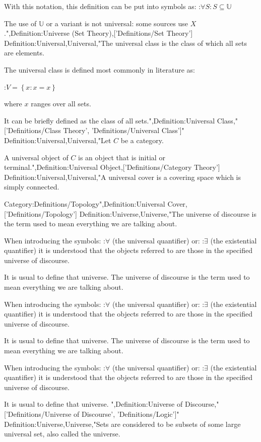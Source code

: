 With this notation, this definition can be put into symbols as:
:$\forall S: S \subseteq \mathbb U$


The use of $\mathbb U$ or a variant is not universal: some sources use $X$.",Definition:Universe (Set Theory),['Definitions/Set Theory']
Definition:Universal,Universal,"The universal class is the class of which all sets are elements.


The universal class is defined most commonly in literature as:

:$V = \left\lbrace x: x = x \right\rbrace$

where $x$ ranges over all sets.


It can be briefly defined as the class of all sets.",Definition:Universal Class,"['Definitions/Class Theory', 'Definitions/Universal Class']"
Definition:Universal,Universal,"Let $C$ be a category.


A universal object of $C$ is an object that is initial or terminal.",Definition:Universal Object,['Definitions/Category Theory']
Definition:Universal,Universal,"A universal cover is a covering space which is simply connected.



Category:Definitions/Topology",Definition:Universal Cover,['Definitions/Topology']
Definition:Universe,Universe,"The universe of discourse is the term used to mean everything we are talking about.


When introducing the symbols:
:$\forall$ (the universal quantifier)
or:
:$\exists$ (the existential quantifier)
it is understood that the objects referred to are those in the specified universe of discourse.

It is usual to define that universe.
The universe of discourse is the term used to mean everything we are talking about.


When introducing the symbols:
:$\forall$ (the universal quantifier)
or:
:$\exists$ (the existential quantifier)
it is understood that the objects referred to are those in the specified universe of discourse.

It is usual to define that universe.
The universe of discourse is the term used to mean everything we are talking about.


When introducing the symbols:
:$\forall$ (the universal quantifier)
or:
:$\exists$ (the existential quantifier)
it is understood that the objects referred to are those in the specified universe of discourse.

It is usual to define that universe.
",Definition:Universe of Discourse,"['Definitions/Universe of Discourse', 'Definitions/Logic']"
Definition:Universe,Universe,"Sets are considered to be subsets of some large universal set, also called the universe.

